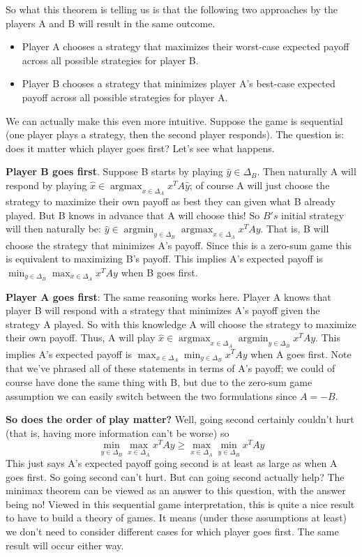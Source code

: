 \documentclass[12pt]{article}
\DeclareMathOperator*{\argmax}{argmax}
\DeclareMathOperator*{\argmin}{argmin}
\begin{document}
So what this theorem is telling us is that the following two approaches by the players A and B will result in the same outcome. 
\begin{itemize}
\item Player A chooses a strategy that maximizes their worst-case expected payoff across all possible strategies for player B. 
\item Player B chooses a strategy that minimizes player A's best-case expected payoff across all possible strategies for player A. 
\end{itemize}

We can actually make this even more intuitive. Suppose the game is sequential (one player plays a strategy, then the second player responds). The question is: does it matter 
which player goes first? Let's see what happens. 

\bigskip

\textbf{Player B goes first}. Suppose B starts by playing $\hat{y} \in \Delta_B$. Then naturally A will respond by playing $\hat{x} \in \argmax_{x \in \Delta_A} x^T A \hat{y}$; of course A will just 
choose the strategy to maximize their own payoff as best they can given what B already played. But B knows in advance that A will choose this! 
So $B's$ initial strategy will then naturally be: $\hat{y} \in \argmin_{y \in \Delta_B} \argmax_{x \in \Delta_A} x^T A y$. That is, B will choose the strategy that minimizes A's payoff. Since this is 
a zero-sum game this is equivalent to maximizing B's payoff. This implies A's expected payoff is $\min_{y \in \Delta_B} \max_{x \in \Delta_A} x^T A y$ when B goes first. 

\bigskip

\textbf{Player A goes first}: The same reasoning works here. Player A knows that player B will respond with a strategy that minimizes A's payoff given the strategy A played. So with this knowledge
A will choose the strategy to maximize their own payoff. Thus, A will 
play $\hat{x} \in \argmax_{x \in \Delta_A} \argmin_{y \in \Delta_B} x^T A y$. This implies A's expected payoff is $\max_{x \in \Delta_A} \min_{y \in \Delta_B} x^T A y$ when A goes first. 
Note that we've phrased all of these statements in terms of A's payoff; we could of course have done the same thing with B, 
but due to the zero-sum game assumption we can easily switch between the two formulations since $A = -B$. 

\bigskip

\textbf{So does the order of play matter?} Well, going second certainly couldn't hurt (that is, having more information can't be worse) so
\[\min_{y \in \Delta_B} \max_{x \in \Delta_A} x^T A y \geq \max_{x \in \Delta_A} \min_{y \in \Delta_B} x^T A y\]
This just says A's expected payoff going second is at least as large as when A goes first. So going second can't hurt. But can going second actually help? The minimax theorem can be viewed
as an answer to this question, with the answer being no! Viewed in this sequential game interpretation, this is quite a nice result to have to build a theory of games. It means (under these assumptions 
at least) we don't need to consider different cases for which player goes first. The same result will occur either way. 
\end{document}
